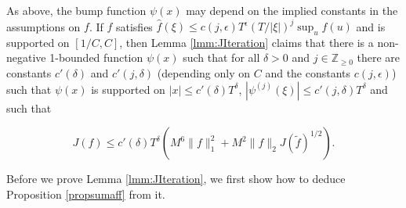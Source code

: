 \documentclass{amsart}
\theoremstyle{plain}
\numberwithin{equation}{section}
\renewcommand{\tilde}{\widetilde}
\begin{document}
%
%

As above, the bump function $\psi(x)$ may depend on the implied constants in the assumptions on $f$. If $f$ satisfies $\widehat{f}(\xi)\le c(j,\epsilon)T^\epsilon (T/|\xi|)^j\sup_u f(u)$ and is supported on $[1/C,C]$, then Lemma \ref{lmm:JIteration} claims that there is a non-negative 1-bounded function $\psi(x)$ such that for all $\delta>0$ and $j\in \mathbb{Z}_{\ge 0}$ there are constants $c'(\delta)$ and $c'(j,\delta)$ (depending only on $C$ and the constants $c(j,\epsilon)$) such that $\psi(x)$ is supported on $|x|\le c'(\delta)T^\delta$, $|\psi^{(j)}(\xi)|\le c'(j,\delta)T^\delta$ and such that

\[
J(f)\le c'(\delta)T^\delta (M^6 \|f\|_1^2+M^2\|f\|_2J(\tilde{f})^{1/2}).
\]

Before we prove Lemma \ref{lmm:JIteration}, we first show how to deduce Proposition \ref{propsumaff} from it.
\end{document}
